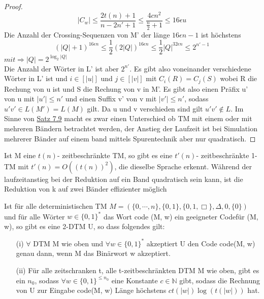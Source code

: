 \begin{proof}
        \[
            |C_w| \leq \frac{2t(n)+1}{n-2n' + 1} \leq \frac{4cn^2}{\frac{n}{2} + 1} \leq 16\epsilon u    
        \]
        Die Anzahl der Crossing-Sequenzen von M' der länge \(16\epsilon n -1\) ist höchstens 
        \[
            (|Q| + 1)^{16\epsilon n} \leq \frac{1}{2} (2|Q|)^{16 \epsilon n} \leq \frac{1}{2} |Q|^{32 \epsilon n} \leq 2^{n'-1} 
        \]
        \(mit \Rightarrow |Q| = 2^{\log_2 |Q|}\) \\ Die Anzahl der Wörter in L' ist aber \(2^{n'}\). Es gibt also voneinander verschiedene Wörter in L' ist und \(i \in [|u|]\) und \(j \in [|v|]\) mit \(C_i(R) = C_j(S)\) wobei R die Rechung von u ist und S die Rechung von v in M'. Es gibt also einen Präfix u' von u mit \(|u'| \leq n'\) und einen Suffix v' von v mit \(|v'| \leq n'\), sodass \(u' v' \in L(M') = L(M)\) gilt. Da u und v verschieden sind gilt \(u' v' \not \in L\). 
        \medskip
        Im Sinne von \hyperref[subsec:7.9]{Satz 7.9} macht es zwar einen Unterschied ob TM mit einem oder mit mehreren Bändern betrachtet werden, der Anstieg der Laufzeit ist bei Simulation mehrerer Bänder auf einem band mittels Spurentechnik aber nur quadratisch.
    \end{proof}

    Ist M eine \(t(n)\)- zeitbeschränkte TM, so gibt es eine \(t'(n)\)- zeitbeschränkte 1-TM mit \(t'(n) = O((t(n))^2)\), die dieselbe Sprache erkennt. Während der laufzeitanstieg bei der Reduktion auf ein Band quadratisch sein kann, ist die Reduktion von k auf zwei Bänder effizienter möglich 

    Ist für alle deterministischen TM \(M = (\{0, \cdots, n\}, \{0, 1\}, \{0, 1, \Box\}, \Delta, 0, \{0\})\) und für alle Wörter \(w \in \{0, 1\}^*\) das Wort code (M, w) ein geeigneter Codefür (M, w), so gibt es eine 2-DTM U, so dass folgendes gilt:

    \begin{itemize}
        \item [(i)] \(\forall\) DTM M wie oben und \(\forall w \in \{0, 1\}^*\) akzeptiert U den Code code(M, w) genau dann, wenn M das Binärwort w akzeptiert.
        \item [(ii)] Für alle zeitschranken t, alle t-zeitbeschränkten DTM M wie oben, gibt es ein \(n_0\), sodass \(\forall w \in \{0, 1\}^{\leq n_0}\) eine Konstante \(c \in \mathbb{N}\) gibt, sodass die Rechnung von U zur Eingabe code(M, w) Länge höchstens \(ct(|w|)\log(t(|w|))\) hat.
    \end{itemize}

